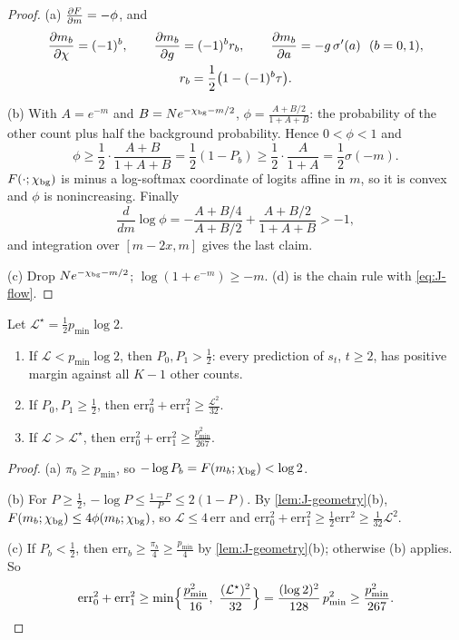 \begin{proof}
(a) $\pd{F}{m}=-\phi$, and
\begin{gather*}
 \pd{m_b}{\cnt}=(-1)^b,\qquad \pd{m_b}{g}=(-1)^br_b,\qquad \pd{m_b}{a}=-g\,\sigma'(a)\ \ (b=0,1),\\
 r_b=\tfrac{1}{2}\bigl(1-(-1)^b\tau\bigr).
\end{gather*}

(b) With $A=e^{-m}$ and $B=Ne^{-\chi_{\mathrm{bg}}-m/2}$, $\phi=\frac{A+B/2}{1+A+B}$: the probability of the other count plus half the background
probability. Hence $0<\phi<1$ and
\[
 \phi\ge\frac{1}{2}\cdot\frac{A+B}{1+A+B}=\frac{1}{2}(1-P_b)\ge\frac{1}{2}\cdot\frac{A}{1+A}=\frac{1}{2}\sigma(-m).
\]
$F(\cdot;\chi_{\mathrm{bg}})$ is minus a log-softmax coordinate of logits affine in $m$, so it is convex and $\phi$ is nonincreasing. Finally
\[
 \frac{d}{dm}\log\phi=-\frac{A+B/4}{A+B/2}+\frac{A+B/2}{1+A+B}>-1,
\]
and integration over $[m-2x,m]$ gives the last claim.

(c) Drop $Ne^{-\chi_{\mathrm{bg}}-m/2}$; $\log(1+e^{-m})\ge-m$. (d) is the chain rule with \cref{eq:J-flow}.
\end{proof}

\begin{lemma}
\label{lem:J-levels}
Let $\mathcal L^\star=\frac{1}{2}p_{\min}\log2$.
\begin{enumerate}[label=(\alph*),leftmargin=*,itemsep=2pt,topsep=3pt]
\item If $\mathcal L<p_{\min}\log2$, then $P_0,P_1>\frac{1}{2}$: every prediction of $s_t$, $t\ge2$, has positive margin against all $K-1$ other counts.
\item If $P_0,P_1\ge\frac{1}{2}$, then $\mathrm{err}_0^2+\mathrm{err}_1^2\ge \frac{\mathcal L^2}{32}$.
\item If $\mathcal L>\mathcal L^\star$, then $\mathrm{err}_0^2+\mathrm{err}_1^2\ge \frac{p_{\min}^2}{267}$.
\end{enumerate}
\end{lemma}

\begin{proof}
(a) $\pi_b\ge p_{\min}$, so $-\log P_b=F(m_b;\chi_{\mathrm{bg}})<\log2$.

(b) For $P\ge\frac{1}{2}$, $-\log P\le\frac{1-P}{P}\le2(1-P)$. By \cref{lem:J-geometry}(b), $F(m_b;\chi_{\mathrm{bg}})\le4\phi(m_b;\chi_{\mathrm{bg}})$, so $\mathcal L\le4\,\mathrm{err}$ and
$\mathrm{err}_0^2+\mathrm{err}_1^2\ge\frac{1}{2}\mathrm{err}^2\ge\frac{1}{32}\mathcal L^2$.

(c) If $P_b<\frac{1}{2}$, then $\mathrm{err}_b\ge\frac{\pi_b}{4}\ge\frac{p_{\min}}{4}$ by \cref{lem:J-geometry}(b); otherwise (b) applies. So
\[
 \mathrm{err}_0^2+\mathrm{err}_1^2\ge\min\Bigl\{\frac{p_{\min}^2}{16},\ \frac{(\mathcal L^\star)^2}{32}\Bigr\}=\frac{(\log2)^2}{128}\,p_{\min}^2\ge\frac{p_{\min}^2}{267}.
\qedhere
\]
\end{proof}

